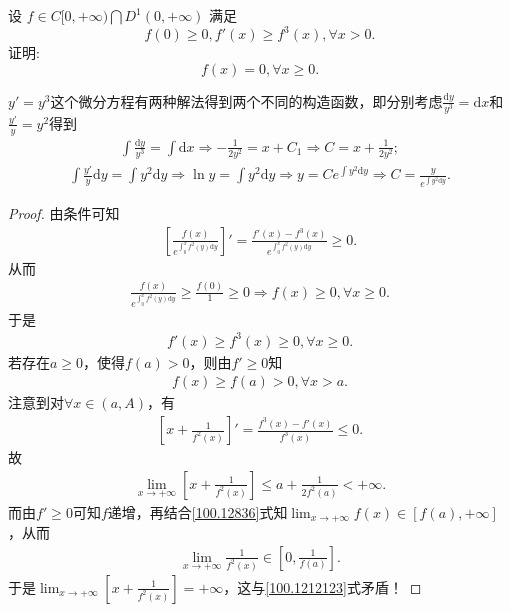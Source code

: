 \documentclass[../../main.tex]{subfiles}
\begin{document}
\begin{example}
设 \( f \in C[0,+\infty) \bigcap D^1(0,+\infty) \) 满足
\[
f(0) \geqslant 0, f'(x) \geqslant f^3(x), \forall x > 0.
\]
证明:
\[
f(x) = 0, \forall x \geqslant 0.
\]
\end{example}
\begin{note}
$y' = y^3$这个微分方程有两种解法得到两个不同的构造函数，即分别考虑$\frac{\mathrm{d}y}{y^3}=\mathrm{d}x$和$\frac{y'}{y}=y^2$得到
\begin{align*}
\int{\frac{\mathrm{d}y}{y^3}}=\int{\mathrm{d}x}\Longrightarrow -\frac{1}{2y^2}=x+C_1\Longrightarrow C=x+\frac{1}{2y^2};
\end{align*}
\begin{align*}
\int{\frac{y'}{y}\mathrm{d}y}=\int{y^2\mathrm{d}y}\Longrightarrow \ln y=\int{y^2\mathrm{d}y}\Longrightarrow y=Ce^{\int{y^2\mathrm{d}y}}\Longrightarrow C=\frac{y}{e^{\int{y^2\mathrm{d}y}}}.
\end{align*}
\end{note}
\begin{proof}
由条件可知
\begin{align*}
\left[ \frac{f\left( x \right)}{e^{\int_0^x{f^2\left( y \right) \mathrm{d}y}}} \right]' =\frac{f' \left( x \right) -f^3\left( x \right)}{e^{\int_0^x{f^2\left( y \right) \mathrm{d}y}}}\geqslant 0.
\end{align*}
从而
\begin{align*}
\frac{f\left( x \right)}{e^{\int_0^x{f^2\left( y \right) \mathrm{d}y}}}\geqslant \frac{f\left( 0 \right)}{1}\geqslant 0\Longrightarrow f\left( x \right) \geqslant 0,\forall x\geqslant 0.
\end{align*}
于是
\begin{align*}
f' \left( x \right) \geqslant f^3\left( x \right) \geqslant 0,\forall x\geqslant 0.
\end{align*}
若存在$a\geqslant 0$，使得$f\left( a \right) >0$，则由$f' \geqslant 0$知
\begin{align}
f\left( x \right) \geqslant f\left( a \right) >0,\forall x>a. \label{100.12836}
\end{align}
注意到对$\forall x\in \left( a,A \right)$，有
\begin{align*}
\left[ x+\frac{1}{f^2\left( x \right)} \right]' =\frac{f^3\left( x \right) -f' \left( x \right)}{f^3\left( x \right)}\leqslant 0.
\end{align*}
故
\begin{align}
\lim_{x\rightarrow +\infty}\left[ x+\frac{1}{f^2\left( x \right)} \right] \leqslant a+\frac{1}{2f^2\left( a \right)}<+\infty . \label{100.1212123}
\end{align}
而由$f' \geqslant 0$可知$f$递增，再结合\eqref{100.12836}式知$\lim_{x\rightarrow +\infty}f\left( x \right) \in \left[ f\left( a \right) ,+\infty \right]$，从而
\begin{align*}
\lim_{x\rightarrow +\infty}\frac{1}{f^2\left( x \right)}\in \left[ 0,\frac{1}{f\left( a \right)} \right] .
\end{align*}
于是$\lim_{x\rightarrow +\infty}\left[ x+\frac{1}{f^2\left( x \right)} \right] =+\infty$，这与\eqref{100.1212123}式矛盾！

\end{proof}
\end{document}
